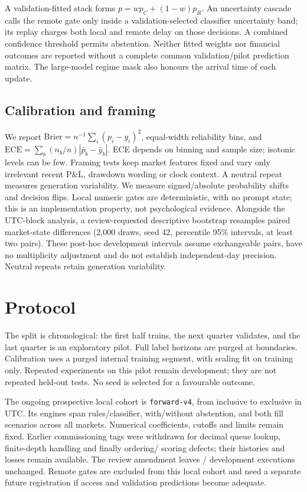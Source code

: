 \documentclass[11pt]{article}
\begin{document}
A validation-fitted stack forms $p=wp_C+(1-w)p_R$. An uncertainty cascade calls
the remote gate only inside a validation-selected classifier uncertainty band;
its replay charges both local and remote delay on those decisions. A combined
confidence threshold permits abstention. Neither fitted weights nor financial
outcomes are reported without a complete common validation/pilot prediction
matrix. The large-model regime mask also honours the arrival time of each update.

\subsection{Calibration and framing}
We report $\mathrm{Brier}=n^{-1}\sum_i(p_i-y_i)^2$, equal-width reliability bins,
and $\mathrm{ECE}=\sum_b(n_b/n)|\bar p_b-\bar y_b|$. ECE depends on binning and
sample size; isotonic levels can be few. Framing tests keep market features fixed
and vary only irrelevant recent P\&L, drawdown wording or clock context. A neutral
repeat measures generation variability. We measure signed/absolute probability
shifts and decision flips. Local numeric gates are deterministic, with no prompt
state; this is an implementation property, not psychological evidence.
Alongside the UTC-block analysis, a review-requested descriptive bootstrap
resamples paired market-state differences (2,000 draws, seed 42, percentile 95\%
intervals, at least two pairs). These post-hoc development intervals assume
exchangeable pairs, have no multiplicity adjustment and do not establish
independent-day precision. Neutral repeats retain generation variability.

\section{Protocol}
The split is chronological: the first half trains, the next quarter validates,
and the last quarter is an exploratory pilot. Full label horizons are purged at
boundaries. Calibration uses a purged internal training segment, with scaling fit
on training only. Repeated experiments on this pilot remain development; they
are not repeated held-out tests. No seed is selected for a favourable outcome.

The ongoing prospective local cohort is \texttt{forward-v4}, from \TestStart{} inclusive
to \TestEnd{} exclusive in UTC. Its \EngineCount{} engines span rules/classifier,
with/without abstention, and both fill scenarios across all markets. Numerical
coefficients, cutoffs and limits remain fixed. Earlier commissioning tags were
withdrawn for decimal queue lookup, finite-depth handling and finally ordering/
scoring defects; their histories and losses remain available. The review
amendment leaves \UnchangedReplays{}/\ReplayCount{} development executions unchanged.
Remote gates are excluded from this local cohort and need a separate future
registration if access and validation predictions become adequate.
\end{document}
